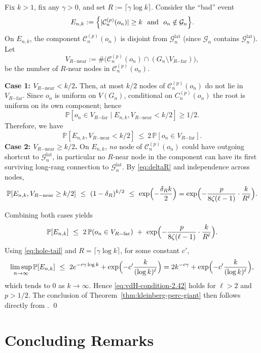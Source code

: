\documentclass[10pt]{amsart}
\begin{document}
Fix $k > 1$, fix any $\gamma>0$, and set $R:=\lceil \gamma\log k\rceil$.
Consider the ``bad'' event
\[E_{n,k}:=\Bigl\{|\mathcal C_n^{(p)}(o_n)|\ge k\ \text{ and }\ o_n\notin \mathcal G_n\Bigr\}.\]
On $E_{n,k}$, the component $\mathcal C_n^{(p)}(o_n)$ is disjoint from $\mathcal G_n^{\mathrm{lat}}$ (since $\mathcal G_n$ contains $\mathcal G_n^{\mathrm{lat}}$).
Let
\[
V_{R\mathrm{-near}}:=\#\bigl(\mathcal C_n^{(p)}(o_n)\cap (G_n\setminus V_{R\mathrm{-far}})\bigr),
\]
be the number of $R$-near nodes in $\mathcal C_n^{(p)}(o_n)$.

\noindent\textbf{Case 1: $V_{R\mathrm{-near}}<k/2$.}
Then, at most $k/2$ nodes of $\mathcal C_n^{(p)}(o_n)$ do not lie in $V_{R\mathrm{-far}}$.
Since $o_n$ is uniform on $V(G_n)$, conditional on $C_n^{(p)}(o_n)$ the root is uniform on its own component; hence
$$\mathbb P[o_n\in V_{R\mathrm{-far}}\mid E_{n,k},V_{R\mathrm{-near}}<k/2]\ge 1/2.$$ Therefore, we have
\[
\mathbb P[E_{n,k},V_{R\mathrm{-near}}<k/2]\ \le\ 2\,\mathbb P[o_n\in V_{R\mathrm{-far}}].
\]
\noindent\textbf{Case 2: $V_{R\mathrm{-near}}\ge k/2$.}
On $E_{n,k}$, \emph{no} node of $\mathcal C_n^{(p)}(o_n)$ could have outgoing shortcut to $\mathcal G_n^{\mathrm{lat}}$,
in particular no $R$-near node in the component can have its first surviving long-rang connection to $\mathcal G_n^{\mathrm{lat}}$.
By \eqref{eq:deltaR} and independence across nodes,
\[
\mathbb P[E_{n,k},V_{R\mathrm{-near}}\ge k/2]\ \le\ (1-\delta_R)^{k/2}
\ \le\ \exp\Bigl(-\frac{\delta_R k}{2}\Bigr)
=\exp\Bigl(-\frac{p}{8\zeta(\ell-1)}\cdot \frac{k}{R^\ell}\Bigr).
\]

Combining both cases yields
\begin{equation}\label{eq:Ek-bound}
\mathbb P[E_{n,k}]
\ \le\
2\,\mathbb P(o_n\in V_{R\mathrm{-far}})
\ +\
\exp\Bigl(-\frac{p}{8\zeta(\ell-1)}\cdot \frac{k}{R^\ell}\Bigr).
\end{equation}
Using \eqref{eq:hole-tail} and $R=\lceil\gamma\log k\rceil$, for some constant $c'$,
\[
\limsup_{n\to\infty}\mathbb P[E_{n,k}]
\ \le\
2e^{-c\gamma\log k}
+\exp\Bigl(-c'\frac{k}{(\log k)^\ell}\Bigr)
=
2k^{-c\gamma}
+\exp\Bigl(-c'\frac{k}{(\log k)^\ell}\Bigr),
\]
which tends to $0$ as $k\to\infty$. Hence \eqref{eq:vdH-condition-2.42} holds for $\ell>2$ and $p>1/2$. The conclusion of Theorem~\ref{thm:kleinberg-perc-giant} then follows directly from
\cite[Theorem~2.2]{vanderhofstad2023giant}. \qed

\section{Concluding Remarks}
\end{document}
